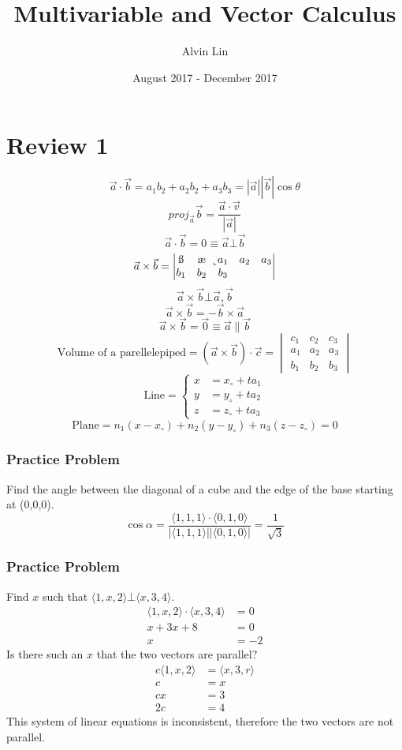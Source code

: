 \documentclass{math}
\title{Multivariable and Vector Calculus}
\author{Alvin Lin}
\date{August 2017 - December 2017}
\begin{document}
\maketitle

\section*{Review 1}
\[ \vec{a}\cdot\vec{b} = a_1b_2+a_2b_2+a_3b_3 =
  |\vec{a}||\vec{b}|\cos\theta \]
\[ proj_{\vec{a}}\vec{b} = \frac{\vec{a}\cdot\vec{v}}{|\vec{a}|} \]
\[ \vec{a}\cdot\vec{b} = 0 \equiv \vec{a}\bot\vec{b} \]
\[ \vec{a}\times\vec{b} = \begin{vmatrix}
  \i & \j & \k \\
  a_1 & a_2 & a_3 \\
  b_1 & b_2 & b_3
\end{vmatrix} \]
\[ \vec{a}\times\vec{b}\bot\vec{a},\vec{b} \]
\[ \vec{a}\times\vec{b} = -\vec{b}\times\vec{a} \]
\[ \vec{a}\times\vec{b} = \vec{0} \equiv \vec{a}\parallel\vec{b} \]
\[ \text{Volume of a parellelepiped} = (\vec{a}\times\vec{b})\cdot\vec{c} =
\begin{vmatrix}
  c_1 & c_2 & c_3 \\
  a_1 & a_2 & a_3 \\
  b_1 & b_2 & b_3
\end{vmatrix} \]
\[ \text{Line} = \begin{cases}
  x &= x_{\circ}+ta_1 \\
  y &= y_{\circ}+ta_2 \\
  z &= z_{\circ}+ta_3
\end{cases} \]
\[ \text{Plane} = n_1(x-x_{\circ})+n_2(y-y_{\circ})+n_3(z-z_{\circ}) = 0 \]

\subsubsection*{Practice Problem}
Find the angle between the diagonal of a cube and the edge of the base
starting at (0,0,0).
\[ \cos\alpha = \frac{\langle1,1,1\rangle\cdot\langle0,1,0\rangle}
  {|\langle1,1,1\rangle||\langle0,1,0\rangle|} = \frac{1}{\sqrt{3}} \]

\subsubsection*{Practice Problem}
Find \( x \) such that \( \langle1,x,2\rangle\bot\langle x,3,4\rangle \).
\begin{align*}
  \langle1,x,2\rangle\cdot\langle x,3,4\rangle &= 0 \\
  x+3x+8 &= 0 \\
  x &= -2
\end{align*}
Is there such an \( x \) that the two vectors are parallel?
\begin{align*}
  c\langle1,x,2\rangle &= \langle x,3,r\rangle \\
  c &= x \\
  cx &= 3 \\
  2c &= 4
\end{align*}
This system of linear equations is inconsistent, therefore the two vectors
are not parallel.
\end{document}
